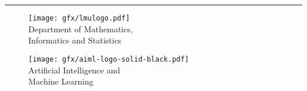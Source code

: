 %
\begin{titlepage}
	\flushright
	\hfill
	\vfill
	{\LARGE\thesisTitle \par}
	\rule[5pt]{\textwidth}{.4pt} \par
	{\Large\thesisName}
	\vfill
	\textit{\large\thesisDate} %
\end{titlepage}


\begin{titlepage}
	\tgherosfont


	\begin{figure}
		\begin{minipage}[t]{8.5cm}
			\texttt{[image: gfx/lmulogo.pdf]}\\
			\textsf{\small{Department of Mathematics,  \\ Informatics and Statistics \\
					\thesisUniversityInstitute
				}}
		\end{minipage}
		\hfill
		\begin{minipage}[t]{4.7cm}
			\texttt{[image: gfx/aiml-logo-solid-black.pdf]}\\
			\textsf{%
				\hspace*{0.1cm}\small{Artificial Intelligence and \\ \hspace*{0.1cm}Machine Learning}
			}
		\end{minipage}
	\end{figure}

	\centering

	\vfill
	{\large \thesisSubject} \\[5mm]
	{\LARGE \color{ctcolortitle}\textbf{\thesisTitle} \\[10mm]}
	{\Large \thesisName} \\


\end{titlepage}
